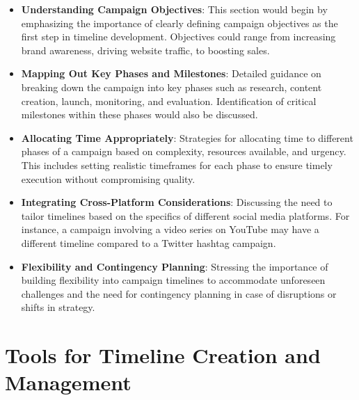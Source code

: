 \documentclass[
]{book}
\providecommand{\tightlist}{%
  \setlength{\itemsep}{0pt}\setlength{\parskip}{0pt}}
\begin{document}
\begin{itemize}
\tightlist
\item
  \textbf{Understanding Campaign Objectives}: This section would begin by emphasizing the importance of clearly defining campaign objectives as the first step in timeline development. Objectives could range from increasing brand awareness, driving website traffic, to boosting sales.
\item
  \textbf{Mapping Out Key Phases and Milestones}: Detailed guidance on breaking down the campaign into key phases such as research, content creation, launch, monitoring, and evaluation. Identification of critical milestones within these phases would also be discussed.
\item
  \textbf{Allocating Time Appropriately}: Strategies for allocating time to different phases of a campaign based on complexity, resources available, and urgency. This includes setting realistic timeframes for each phase to ensure timely execution without compromising quality.
\item
  \textbf{Integrating Cross-Platform Considerations}: Discussing the need to tailor timelines based on the specifics of different social media platforms. For instance, a campaign involving a video series on YouTube may have a different timeline compared to a Twitter hashtag campaign.
\item
  \textbf{Flexibility and Contingency Planning}: Stressing the importance of building flexibility into campaign timelines to accommodate unforeseen challenges and the need for contingency planning in case of disruptions or shifts in strategy.
\end{itemize}

\hypertarget{tools-for-timeline-creation-and-management}{%
\section*{Tools for Timeline Creation and Management}\label{tools-for-timeline-creation-and-management}}
\end{document}
